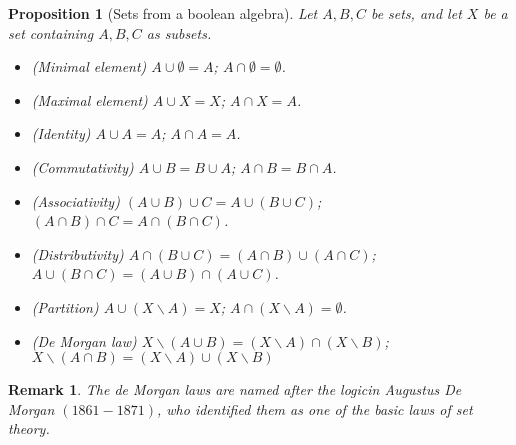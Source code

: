 \documentclass[a4paper,oneside]{book}
\newtheorem{remark}{Remark}[section]
\newtheorem{proposition}{Proposition}[section]
\begin{document}
			\begin{proposition}[Sets from a boolean algebra]
				Let $A,B,C$ be sets, and let $X$ be a set containing $A,B,C$ as subsets.
				\begin{itemize}
					\item[$(a)$] (Minimal element) $A\cup \emptyset=A$; $A\cap \emptyset=\emptyset$.
					\item[$(b)$] (Maximal element) $A\cup X=X$; $A\cap X=A$.
					\item[$(c)$] (Identity) $A\cup A=A$; $A\cap A=A$.
					\item[$(d)$] (Commutativity) $A\cup B=B\cup A$; $A\cap B=B\cap A$.
					\item[$(e)$] (Associativity) $(A\cup B)\cup C=A\cup(B\cup C)$; $(A\cap B)\cap C=A\cap(B\cap C)$.
					\item[$(f)$] (Distributivity) $A\cap(B\cup C)=(A\cap B)\cup(A\cap C)$; $A\cup(B\cap C)=(A\cup B)\cap(A\cup C)$.
					\item[$(g)$] (Partition) $A\cup(X\backslash A)=X$; $A\cap(X\backslash A)=\emptyset$.
					\item[$(h)$] (De Morgan law) $X\backslash(A\cup B)=(X\backslash A)\cap(X\backslash B)$; $X\backslash(A\cap B)=(X\backslash A)\cup(X\backslash B)$
				\end{itemize}
			\end{proposition}
			\begin{remark}
				The de Morgan laws are named after the logicin Augustus De Morgan $(1861-1871)$, who identified them as one of the basic laws of set theory.
			\end{remark}
\end{document}

